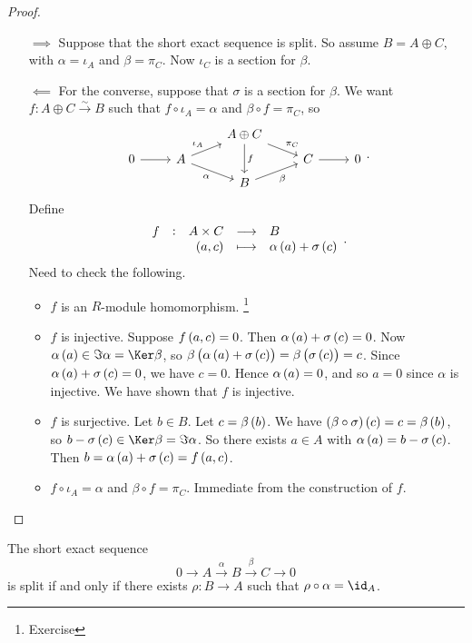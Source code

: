 \begin{proof}
\hfill
\begin{itemize}
\item[$ \implies $] Suppose that the short exact sequence is split. So assume $ B = A \oplus C $, with $ \alpha = \iota_A $ and $ \beta = \pi_C $. Now $ \iota_C $ is a section for $ \beta $.
\item[$ \impliedby $] For the converse, suppose that $ \sigma $ is a section for $ \beta $. We want $ f : A \oplus C \xrightarrow{\sim} B $ such that $ f \circ \iota_A = \alpha $ and $ \beta \circ f = \pi_C $, so
$$
\begin{tikzcd}[row sep=tiny]
& & A \oplus C \arrow{dr}{\pi_C} \arrow{dd}{f} & & \\
0 \arrow{r} & A \arrow{ur}{\iota_A} \arrow[swap]{dr}{\alpha} & & C \arrow{r} & 0 \\
& & B \arrow[swap]{ur}{\beta} & &
\end{tikzcd}.
$$
Define
$$ \function[f]{A \times C}{B}{\br{a, c}}{\alpha\br{a} + \sigma\br{c}}. $$
Need to check the following.
\begin{itemize}
\item $ f $ is an $ R $-module homomorphism. \footnote{Exercise}
\item $ f $ is injective. Suppose $ f\br{a, c} = 0 $. Then $ \alpha\br{a} + \sigma\br{c} = 0 $. Now $ \alpha\br{a} \in \Im \alpha = \Ker \beta $, so $ \beta\br{\alpha\br{a} + \sigma\br{c}} = \beta\br{\sigma\br{c}} = c $. Since $ \alpha\br{a} + \sigma\br{c} = 0 $, we have $ c = 0 $. Hence $ \alpha\br{a} = 0 $, and so $ a = 0 $ since $ \alpha $ is injective. We have shown that $ f $ is injective.
\item $ f $ is surjective. Let $ b \in B $. Let $ c = \beta\br{b} $. We have $ \br{\beta \circ \sigma}\br{c} = c = \beta\br{b} $, so $ b - \sigma\br{c} \in \Ker \beta = \Im \alpha $. So there exists $ a \in A $ with $ \alpha\br{a} = b - \sigma\br{c} $. Then $ b = \alpha\br{a} + \sigma\br{c} = f\br{a, c} $.
\item $ f \circ \iota_A = \alpha $ and $ \beta \circ f = \pi_C $. Immediate from the construction of $ f $.
\end{itemize}
\end{itemize}
\end{proof}

\begin{proposition}
The short exact sequence
$$ 0 \to A \xrightarrow{\alpha} B \xrightarrow{\beta} C \to 0 $$
is split if and only if there exists $ \rho : B \to A $ such that $ \rho \circ \alpha = \id_A $.
\end{proposition}

